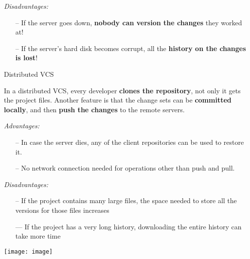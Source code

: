 \begin{multicols*}{2}
\textit{Disadvantages:}
\begin{itemize}
\item [--] If the server goes down, \textbf{nobody can version the changes} they worked at!
\item [--] If the server's hard disk becomes corrupt, all the \textbf{history on the changes is lost}!
\end{itemize}

\textcolor{b}{Distributed VCS}

In a distributed VCS, every developer \textbf{clones the repository}, not only it gets the project files.
Another feature is that the change sets can be \textbf{committed locally}, and then \textbf{push the changes} to the remote servers.

\textit{Advantages:}
\begin{itemize}
\item [--] In case the server dies, any of the client repositories can be used to restore it.
\item [--] No network connection needed for operations other than push and pull.
\end{itemize}
\textit{Disadvantages:}
\begin{itemize}
\item [--] If the project contains many large files, the space needed to store all the versions for those files increases
\item [---] If the project has a very long history, downloading the entire history can take more time
\end{itemize}

\begin{Figure}
\texttt{[image: image]}
\label{fig:vcs}
\end{Figure}

\end{multicols*}